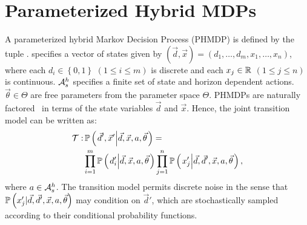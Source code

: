 \section{Parameterized Hybrid MDPs}
\label{sec:hybrid_mdps}

%

A parameterized hybrid Markov Decision Process (PHMDP) is defined by the tuple {\footnotesize \PMDPTuple}. {\footnotesize \State} specifies a vector of states given by {\footnotesize $(\vec{d}, \vec{x}) =  \left( d_1, \ldots, d_m, x_1, \ldots, x_n \right) $}, where each {\footnotesize $ d_i \in \left\lbrace 0, 1 \right\rbrace $} {\footnotesize $\left( 1 \leq i \leq m \right)$} is discrete and each {\footnotesize$ x_j \in \mathbb{R} $} {\footnotesize $\left( 1 \leq j \leq   n \right)$} is continuous. {\footnotesize $\mathcal{A}^{h}_{s}$} specifies a finite set of state and horizon dependent actions.  {\footnotesize $\vec{\theta} \in \Theta$} are free parameters from the parameter space {\footnotesize $ \Theta $}. PHMDPs are naturally factored~\parencite{Boutilier_JAIR_1999} in terms of the state variables {\footnotesize$\vec{d}$} and {\footnotesize
$\vec{x}$}. Hence, the joint transition model can be written as:
{\footnotesize
\abovedisplayskip=0pt
\belowdisplayskip=0pt
\begin{align}
    \label{eq:hmdp_tfunc}
    \mathcal{T} :& \, \mathbb{P}\left({ \left. \vec{d}', \vec{x}' \middle| \vec{d}, \vec{x}, a, \vec{\theta} \right.}\right) = \nonumber \\
    & \prod_{i=1}^{m} \mathbb{P}\left({ \left. d_i' \middle| \vec{d}, \vec{x}, a, \vec{\theta} \right. }\right) \prod_{j=1}^{n} \mathbb{P}\left({ \left. x_j' \middle| \vec{d}, \vec{d}', \vec{x}, a, \vec{\theta} \right. }\right),
\end{align}   
}
where {\footnotesize $ a \in \mathcal{A}^{h}_{s} $}. The transition model permits discrete noise in the sense that {\footnotesize $ \mathbb{P}\left({ x_j' | \vec{d}, \vec{d}', \vec{x}, a, \vec{\theta} }\right) $} may condition on $ \vec{d}' $, which are stochastically sampled according to their conditional probability functions. 

